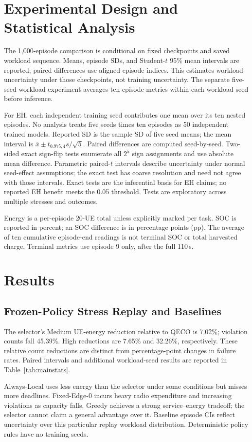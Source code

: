 \documentclass[conference]{IEEEtran}
\begin{document}
\section{Experimental Design and Statistical Analysis}
The 1,000-episode comparison is conditional on fixed checkpoints and saved workload sequence. Means, episode SDs, and Student-$t$ 95\% mean intervals are reported; paired differences use aligned episode indices. This estimates workload uncertainty under those checkpoints, not training uncertainty. The separate five-seed workload experiment averages ten episode metrics within each workload seed before inference.

For EH, each independent training seed contributes one mean over its ten nested episodes. No analysis treats five seeds times ten episodes as 50 independent trained models. Reported SD is the sample SD of five seed means; the mean interval is $\bar x\pm t_{0.975,4}s/\sqrt5$. Paired differences are computed seed-by-seed. Two-sided exact sign-flip tests enumerate all $2^5$ sign assignments and use absolute mean difference. Parametric paired-$t$ intervals describe uncertainty under normal seed-effect assumptions; the exact test has coarse resolution and need not agree with those intervals. Exact tests are the inferential basis for EH claims; no reported EH benefit meets the 0.05 threshold. Tests are exploratory across multiple stresses and outcomes.

Energy is a per-episode 20-UE total unless explicitly marked per task. SOC is reported in percent; an SOC difference is in percentage points (pp). The average of ten cumulative episode-end readings is not terminal SOC or total harvested charge. Terminal metrics use episode 9 only, after the full 110\,s.

\section{Results}
\subsection{Frozen-Policy Stress Replay and Baselines}

The selector's Medium UE-energy reduction relative to QECO is 7.02\%; violation counts fall 45.39\%. High reductions are 7.65\% and 32.26\%, respectively. These relative count reductions are distinct from percentage-point changes in failure rates. Paired intervals and additional workload-seed results are reported in Table~\ref{tab:mainstats}.

Always-Local uses less energy than the selector under some conditions but misses more deadlines. Fixed-Edge-0 incurs heavy radio expenditure and increasing violations as capacity falls. Greedy achieves a strong service--energy tradeoff; the selector cannot claim a general advantage over it. Baseline episode CIs reflect uncertainty over this particular replay workload distribution. Deterministic policy rules have no training seeds.
\end{document}
